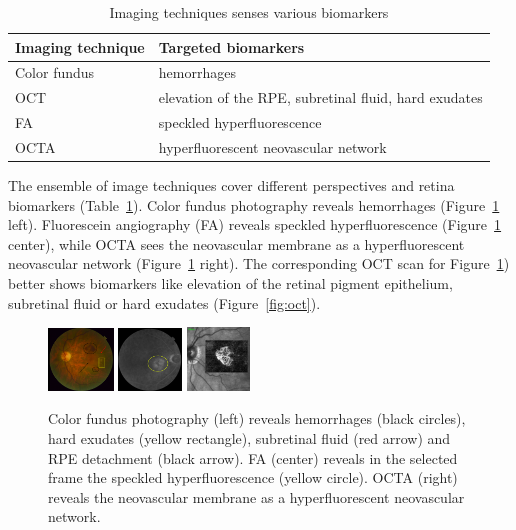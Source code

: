 \documentclass[conference]{IEEEtran}
\begin{document}
\begin{table}%
    \centering
    \caption{Imaging techniques senses various biomarkers}
    \label{tab:img}
    \begin{tabular}{ll}
        Imaging technique & Targeted biomarkers \\ \hline
        Color fundus &  hemorrhages \\
        OCT & elevation of the RPE, subretinal fluid, hard exudates \\
        FA & speckled hyperfluorescence \\
        OCTA &  hyperfluorescent neovascular network\\ %
    \end{tabular}
\end{table}


The ensemble of image techniques cover different perspectives and retina biomarkers (Table~\ref{tab:img}).
Color fundus photography reveals hemorrhages (Figure~\ref{fig:hemo} left). 
Fluorescein angiography (FA) reveals speckled hyperfluorescence (Figure~\ref{fig:hemo} center), while 
 OCTA sees the neovascular membrane as a hyperfluorescent neovascular network (Figure~\ref{fig:hemo} right).
The corresponding OCT scan for Figure~\ref{fig:hemo}) better shows biomarkers like elevation of the retinal pigment epithelium, subretinal fluid or hard exudates (Figure~\ref{fig:oct}). 

\begin{figure}
    \centering
    \includegraphics[width=0.155\textwidth]{fig/1.png}  \hfill
    \includegraphics[width=0.15\textwidth]{fig/3.png}  \hfill
    \includegraphics[width=0.15\textwidth]{fig/Fig4.png} \hfill
    \caption{Color fundus photography (left) reveals hemorrhages (black circles), hard exudates (yellow rectangle), subretinal fluid (red arrow) and RPE detachment (black arrow). FA (center) reveals in the selected frame the speckled hyperfluorescence (yellow circle). 
    OCTA (right) reveals the neovascular membrane as a hyperfluorescent neovascular network.}
    \label{fig:hemo}
\end{figure}
\end{document}
